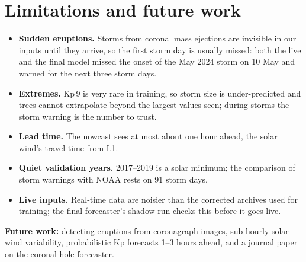 \documentclass[conference,a4paper]{IEEEtran}
\begin{document}
\FloatBarrier
\section{Limitations and future work}
\begin{itemize}
\item \textbf{Sudden eruptions.} Storms from coronal mass ejections are invisible in our inputs until they arrive,
so the first storm day is usually missed: both the live and the final model missed the onset of the May 2024 storm
on 10 May and warned for the next three storm days.
\item \textbf{Extremes.} Kp\,9 is very rare in training, so storm size is under-predicted and trees cannot
extrapolate beyond the largest values seen; during storms the storm warning is the number to trust.
\item \textbf{Lead time.} The nowcast sees at most about one hour ahead, the solar wind's travel time from L1.
\item \textbf{Quiet validation years.} 2017--2019 is a solar minimum; the comparison of storm warnings with NOAA
rests on 91 storm days.
\item \textbf{Live inputs.} Real-time data are noisier than the corrected archives used for training; the final
forecaster's shadow run checks this before it goes live.
\end{itemize}
\textbf{Future work:} detecting eruptions from coronagraph images, sub-hourly solar-wind variability, probabilistic
Kp forecasts 1--3 hours ahead, and a journal paper on the coronal-hole forecaster.
\end{document}
